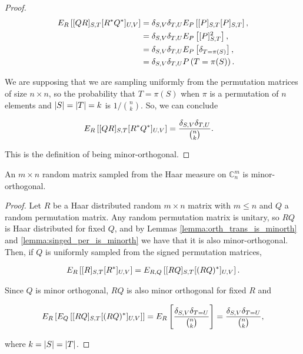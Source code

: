 \begin{proof}
    \begin{align*}
        E_R \left[ [QR]_{S,T}[R^*Q^*]_{U,V} \right] &= \delta_{S,V} \delta_{T,U} E_{P}\left[  [P]_{S,T}[P]_{S,T} \right],\\ 
        &= \delta_{S,V} \delta_{T,U} E_{P}\left[  [P]_{S,T}^2 \right],\\ 
        &= \delta_{S,V} \delta_{T,U} E_{P}\left[  \delta_{T=\pi(S)} \right], \\ 
        &= \delta_{S,V} \delta_{T,U} P\left( T = \pi(S) \right).
    \end{align*}

    We are supposing that we are sampling uniformly from the permutation matrices of size $n \times n$, so the probability that $T = \pi(S)$ when $\pi$ is a permutation of $n$ elements and $\lvert S \rvert = \lvert T \rvert = k$ is $1/\binom{n}{k}$. So, we can conclude

    \begin{align*}
        E_R \left[ [QR]_{S,T}[R^*Q^*]_{U,V} \right] &= \frac{\delta_{S,V} \delta_{T,U}}{\binom{n}{k}}.
    \end{align*}

    This is the definition of being minor-orthogonal. 

\end{proof}


\begin{corollary}
    An $m\times n$ random matrix sampled from the Haar measure on $\mathbb C_{n}^m$ is minor-orthogonal.
\end{corollary}

\begin{proof}
    Let $R$ be a Haar distributed random $m\times n$ matrix with $m \le n$ and $Q$ a random permutation matrix. Any random permutation matrix is unitary, so $RQ$ is Haar distributed for fixed $Q$, and by Lemmas \ref{lemma:orth_trans_is_minorth} and \ref{lemma:singed_per_is_minorth} we have that it is also minor-orthogonal. Then, if $Q$ is uniformly sampled from the signed permutation matrices,

    \begin{align*}
        E_R\left[ [R]_{S,T}[R^*]_{U,V} \right] = E_{R,Q}\left[ [RQ]_{S,T} [(RQ)^*]_{U,V}\right]. 
    \end{align*}

    Since $Q$ is minor orthogonal, $RQ$ is also minor orthogonal for fixed $R$ and 

    \begin{align*}
        E_R\left[ E_Q \left[ [RQ]_{S,T}[(RQ)^*]_{U,V} \right] \right] = E_R\left[ \frac{\delta_{S,V}\delta_{T=U}}{\binom{n}{k}}\right] = \frac{\delta_{S,V}\delta_{T=U}}{\binom{n}{k}},
    \end{align*}

    \noindent where $k = \lvert S \rvert = \lvert T \rvert$. 
\end{proof}


